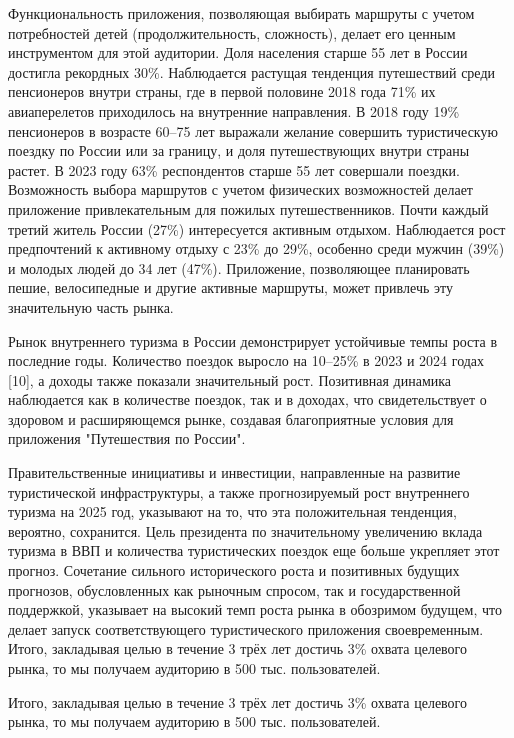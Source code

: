 Функциональность приложения, позволяющая выбирать маршруты с учетом потребностей детей (продолжительность, сложность), делает его ценным инструментом для этой аудитории.
Доля населения старше 55 лет в России достигла рекордных 30\%. Наблюдается растущая тенденция путешествий среди пенсионеров внутри страны, где в первой половине 2018 года 71\% их авиаперелетов приходилось на внутренние направления. В 2018 году 19\% пенсионеров в возрасте 60–75 лет выражали желание совершить туристическую поездку по России или за границу, и доля путешествующих внутри страны растет. В 2023 году 63\% респондентов старше 55 лет совершали поездки. Возможность выбора маршрутов с учетом физических возможностей делает приложение привлекательным для пожилых путешественников.
Почти каждый третий житель России (27\%) интересуется активным отдыхом. Наблюдается рост предпочтений к активному отдыху с 23\% до 29\%, особенно среди мужчин (39\%) и молодых людей до 34 лет (47\%). Приложение, позволяющее планировать пешие, велосипедные и другие активные маршруты, может привлечь эту значительную часть рынка.

Рынок внутреннего туризма в России демонстрирует устойчивые темпы роста в последние годы. Количество поездок выросло на 10–25\% в 2023 и 2024 годах [10], а доходы также показали значительный рост. Позитивная динамика наблюдается как в количестве поездок, так и в доходах, что свидетельствует о здоровом и расширяющемся рынке, создавая благоприятные условия для приложения "Путешествия по России".

Правительственные инициативы и инвестиции, направленные на развитие туристической инфраструктуры, а также прогнозируемый рост внутреннего туризма на 2025 год, указывают на то, что эта положительная тенденция, вероятно, сохранится. Цель президента по значительному увеличению вклада туризма в ВВП и количества туристических поездок еще больше укрепляет этот прогноз. Сочетание сильного исторического роста и позитивных будущих прогнозов, обусловленных как рыночным спросом, так и государственной поддержкой, указывает на высокий темп роста рынка в обозримом будущем, что делает запуск соответствующего туристического приложения своевременным.
Итого, закладывая целью в течение 3 трёх лет достичь 3\% охвата целевого рынка, то мы получаем аудиторию в 500 тыс. пользователей.

Итого, закладывая целью в течение 3 трёх лет достичь 3\% охвата целевого рынка, то мы получаем аудиторию в 500 тыс. пользователей.

